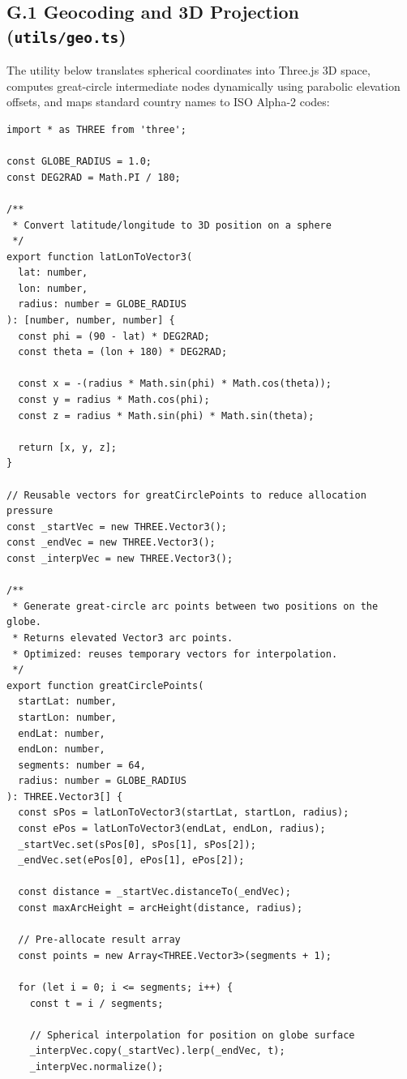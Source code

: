 \subsection*{G.1 Geocoding and 3D Projection (\texttt{utils/geo.ts})}
The utility below translates spherical coordinates into Three.js 3D space, computes great-circle intermediate nodes dynamically using parabolic elevation offsets, and maps standard country names to ISO Alpha-2 codes:
\begin{verbatim}
import * as THREE from 'three';

const GLOBE_RADIUS = 1.0;
const DEG2RAD = Math.PI / 180;

/**
 * Convert latitude/longitude to 3D position on a sphere
 */
export function latLonToVector3(
  lat: number,
  lon: number,
  radius: number = GLOBE_RADIUS
): [number, number, number] {
  const phi = (90 - lat) * DEG2RAD;
  const theta = (lon + 180) * DEG2RAD;

  const x = -(radius * Math.sin(phi) * Math.cos(theta));
  const y = radius * Math.cos(phi);
  const z = radius * Math.sin(phi) * Math.sin(theta);

  return [x, y, z];
}

// Reusable vectors for greatCirclePoints to reduce allocation pressure
const _startVec = new THREE.Vector3();
const _endVec = new THREE.Vector3();
const _interpVec = new THREE.Vector3();

/**
 * Generate great-circle arc points between two positions on the globe.
 * Returns elevated Vector3 arc points.
 * Optimized: reuses temporary vectors for interpolation.
 */
export function greatCirclePoints(
  startLat: number,
  startLon: number,
  endLat: number,
  endLon: number,
  segments: number = 64,
  radius: number = GLOBE_RADIUS
): THREE.Vector3[] {
  const sPos = latLonToVector3(startLat, startLon, radius);
  const ePos = latLonToVector3(endLat, endLon, radius);
  _startVec.set(sPos[0], sPos[1], sPos[2]);
  _endVec.set(ePos[0], ePos[1], ePos[2]);

  const distance = _startVec.distanceTo(_endVec);
  const maxArcHeight = arcHeight(distance, radius);

  // Pre-allocate result array
  const points = new Array<THREE.Vector3>(segments + 1);

  for (let i = 0; i <= segments; i++) {
    const t = i / segments;

    // Spherical interpolation for position on globe surface
    _interpVec.copy(_startVec).lerp(_endVec, t);
    _interpVec.normalize();


\end{verbatim}
